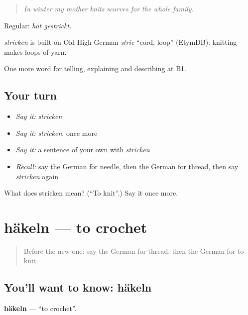 \begin{quote}
\emph{In winter my mother knits scarves for the whole family.}
\end{quote}

Regular: \emph{hat gestrickt}.

\begin{cousinweb}
\emph{stricken} is built on Old High German \emph{stric} \textquotedblleft{}cord, loop\textquotedblright{} (EtymDB): knitting makes loops of yarn.
\end{cousinweb}

\begin{grammarlens}[title={What you've built}]
One more word for telling, explaining and describing at B1.
\end{grammarlens}

\subsection*{Your turn}
\begin{itemize}
\raggedright
  \item \emph{Say it:} \emph{stricken}
  \item \emph{Say it:} \emph{stricken}, once more
  \item \emph{Say it:} a sentence of your own with \emph{stricken}
  \item \emph{Recall:} say the German for needle, then the German for thread, then say \emph{stricken} again
\end{itemize}

\begin{tcolorbox}[breakable,colback=teal!4,colframe=teal!35!black,title={Before you move on}]
What does stricken mean? (\textquotedblleft{}To knit\textquotedblright{}.) Say it once more.
\end{tcolorbox}
\section[häkeln]{häkeln — to crochet}

\label{lesson:GE-C499-haekeln}



\begin{quote}
Before the new one: say the German for thread, then the German for to knit.
\end{quote}

\subsection*{You'll want to know: häkeln}
\textbf{häkeln} — \textquotedblleft{}to crochet\textquotedblright{}.

